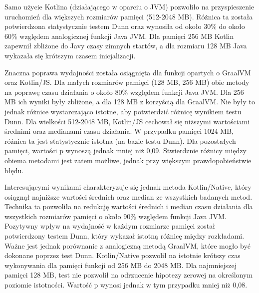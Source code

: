Samo użycie Kotlina (działającego w oparciu o JVM) pozwoliło na przyspieszenie uruchomień dla większych rozmiarów pamięci (512-2048 MB).
Różnica ta została potwierdzona statystycznie testem Dunn oraz wynosiła od około 30\% do około 60\% względem analogicznej funkcji Java JVM.
Dla pamięci 256 MB Kotlin zapewnił zbliżone do Javy czasy zimnych startów, a dla rozmiaru 128 MB Java wykazała się krótszym czasem inicjalizacji.

Znaczna poprawa wydajności została osiągnięta dla funkcji opartych o GraalVM oraz Kotlin/JS.
Dla małych rozmiarów pamięci (128 MB, 256 MB) obie metody na poprawę czasu działania o około 80\% względem funkcji Java JVM.
Dla 256 MB ich wyniki były zbliżone, a dla 128 MB z korzyścią dla GraalVM.
Nie były to jednak różnice wystarczająco istotne, aby potwierdzić różnicę wynikiem testu Dunn.
Dla wielkości 512-2048 MB, Kotlin/JS cechował się niższymi wartościami średnimi oraz medianami czasu działania.
W przypadku pamięci 1024 MB, różnica ta jest statystycznie istotna (na bazie testu Dunn).
Dla pozostałych pamięci, wartości p wynoszą jednak mniej niż 0,09. 
Stwierdznie różnicy między obiema metodami jest zatem możliwe, jednak przy większym prawdopobieństwie błędu.

Interesującymi wynikami charakteryzuje się jednak metoda Kotlin/Native, który osiągnął najniższe wartości średnich oraz median ze wszystkich badanych metod.
Technika ta pozwoliła na redukcję wartości średnich i median czasu działania dla wszystkich rozmiarów pamięci o około 90\% względem funkcji Java JVM.
Pozytywny wpływ na wydajność w każdym rozmiarze pamięci został potwierdzony testem Dunn, który wykazał istotną różnicę między rozkładami.
Ważne jest jednak porównanie z analogiczną metodą GraalVM, które mogło być dokonane poprzez test Dunn.
Kotlin/Native pozwolił na istotnie krótszy czas wykonywania dla pamięci funkcji od 256 MB do 2048 MB.
Dla najmniejszej pamięci 128 MB, test nie pozwolił na odrzucenie hipotezy zerowej na określonym poziomie istotności.
Wartość p wynosi jednak w tym przypadku mniej niż 0,08.

